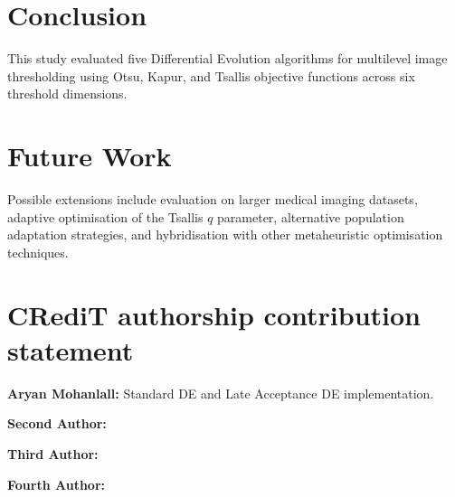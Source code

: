 \documentclass[review]{elsarticle}
\begin{document}

\section{Conclusion}
\label{sec:conclusion}

This study evaluated five Differential Evolution algorithms for
multilevel image thresholding using Otsu, Kapur, and Tsallis objective
functions across six threshold dimensions.

%
%



\section{Future Work}

Possible extensions include evaluation on larger medical imaging
datasets, adaptive optimisation of the Tsallis $q$ parameter, alternative
population adaptation strategies, and hybridisation with other
metaheuristic optimisation techniques.



\section*{CRediT authorship contribution statement}

\textbf{Aryan Mohanlall:}
Standard DE and Late Acceptance DE implementation.

\textbf{Second Author:}

\textbf{Third Author:}

\textbf{Fourth Author:}


\end{document}
